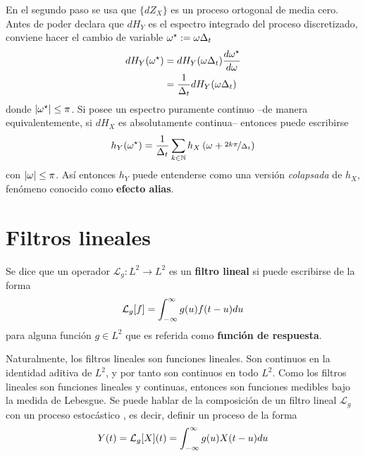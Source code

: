 En el segundo paso se usa que $\{ dZ_X \}$ es un proceso ortogonal de media cero.
Antes de poder declara que $dH_Y$ es el espectro integrado del proceso discretizado,
conviene hacer el cambio de variable $\omega^{\star} := \omega \Delta_t$
\begin{align*}
dH_Y(\omega^{\star}) &= dH_Y(\omega \Delta_t) \frac{d\omega^{\star}}{d\omega} \\
&= \frac{1}{\Delta_t} dH_Y(\omega \Delta_t)
\end{align*}
donde $\left| \omega^{\star} \right| \leq \pi$.
%
Si \xt posee un espectro puramente continuo --de manera equivalentemente, si $dH_X$ es 
absolutamente continua-- entonces puede escribirse
\begin{equation}
h_Y(\omega^{\star}) = \frac{1}{\Delta_t} \sum_{k \in \mathbb{N}} h_X\left( \omega + \nicefrac{2 k \pi}{\Delta_t}\right)
\end{equation}
con $\left| \omega \right| \leq \pi$. 
%
Así entonces $h_Y$ puede entenderse como una versión \textit{colapsada} de $h_X$, fenómeno conocido 
como \textbf{efecto alias}.


\section{Filtros lineales}


\begin{definicion}
Se dice que un operador $\mathcal{L}_g : L^{2} \rightarrow L^{2}$ es un \textbf{filtro lineal} si puede escribirse de la forma
\begin{equation}
\mathcal{L}_g[f] = \int_{-\infty}^{\infty} g(u) f(t-u) du
\end{equation}
para alguna función $g\in L^{2}$ que es referida como \textbf{función de respuesta}.
\end{definicion}

Naturalmente, los filtros lineales son funciones lineales. 
%
Son continuos en la identidad aditiva de $L^{2}$, y por tanto son continuos en todo $L^{2}$. 
%
Como los filtros lineales son funciones lineales y continuas, entonces son funciones medibles bajo la medida de Lebesgue. 
%
Se puede hablar de la composición de un filtro lineal $\mathcal{L}_g$ con un proceso estocástico \xt, es decir, definir un proceso de la forma
\begin{equation}
Y(t) = \mathcal{L}_g[X](t) =  \int_{-\infty}^{\infty} g(u) X(t-u) du
\label{eq:filtrado}
\end{equation}

